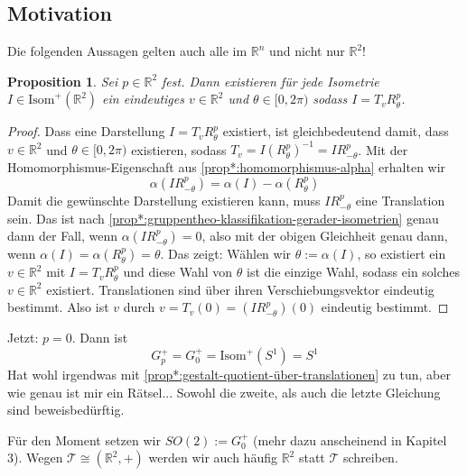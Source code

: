 \documentclass[a4paper, ngerman]{article}
\newcounter{chapter}
\numberwithin{equation}{chapter}
\theoremstyle{plain}
\newtheorem{proposition}{Proposition}[chapter]
\theoremstyle{definition}
\newcommand{\geradisometr}{\ensuremath{\mathrm{Isom}^+(\mathbb R^2)}}
\newcommand{\anm}[1]{{\color{red} #1}}
\begin{document}
\subsection{Motivation}
Die folgenden Aussagen gelten auch alle im \(\mathbb R^n\) und nicht nur \(\mathbb R^2\)!
\begin{proposition}\label{prop:zerlegung-gerader-isometrien}
    Sei \(p \in \mathbb R^2\) fest. Dann existieren für jede Isometrie \(I \in \geradisometr\) ein eindeutiges \(v \in \mathbb R^2\) und \(\theta \in [0,2\pi)\) sodass \(I = T_v R_\theta^p\).  
\end{proposition}
\begin{proof}
    Dass eine Darstellung \(I = T_v R_\theta^p\) existiert, ist gleichbedeutend damit, dass \(v \in \mathbb R^2\) und \(\theta\in [0,2\pi)\) existieren, sodass \(T_v = I(R_\theta^p)^{-1} = I R_{-\theta}^p\). Mit der Homomorphismus-Eigenschaft aus \cref{prop*:homomorphismus-alpha} erhalten wir 
    \begin{equation*}
        \alpha(IR_{-\theta}^p) = \alpha(I) - \alpha(R_\theta^p)
    \end{equation*}
    Damit die gewünschte Darstellung existieren kann, muss \(IR_{-\theta}^p\) eine Translation sein. Das ist nach \cref{prop*:gruppentheo-klassifikation-gerader-isometrien} genau dann der Fall, wenn \(\alpha(IR_{-\theta}^p) = 0\), also mit der obigen Gleichheit genau dann, wenn \(\alpha(I) = \alpha(R_\theta^p) = \theta\). Das zeigt: Wählen wir \(\theta := \alpha(I)\), so existiert ein \(v \in \mathbb R^2\) mit \(I = T_v R_\theta^p\) und diese Wahl von \(\theta\) ist die einzige Wahl, sodass ein solches \(v \in \mathbb R^2\) existiert. Translationen sind über ihren Verschiebungsvektor eindeutig bestimmt. Also ist \(v\) durch \(v = T_v(0) = (IR_{-\theta}^p) (0)\) eindeutig bestimmt. 
\end{proof}
Jetzt: \(p=0\). Dann ist 
\begin{equation*}
    G_p^+ = G_0^+ = \mathrm{Isom}^+(S^1) = S^1
\end{equation*}
\anm{Hat wohl irgendwas mit \cref{prop*:gestalt-quotient-über-translationen} zu tun, aber wie genau ist mir ein Rätsel... Sowohl die zweite, als auch die letzte Gleichung sind beweisbedürftig.}

Für den Moment setzen wir \(SO(2):= G_0^+\) (mehr dazu anscheinend in Kapitel 3). Wegen \(\mathcal T \cong (\mathbb R^2, +)\) werden wir auch häufig \(\mathbb R^2\) statt \(\mathcal T\) schreiben. 
\end{document}
